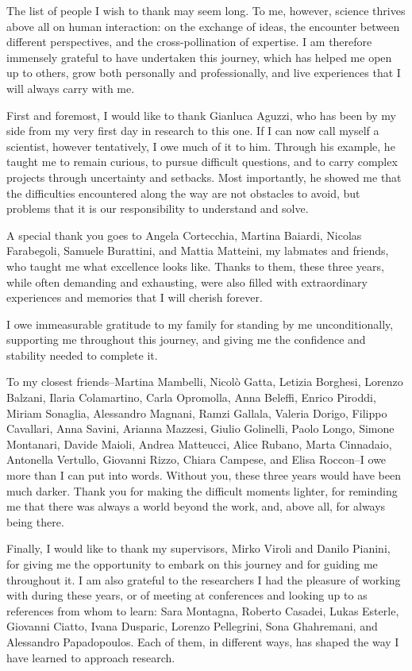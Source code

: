 \documentclass[12pt,a4paper,openright,twoside]{book}
\begin{document}
\begin{acknowledgements} 

The list of people I wish to thank may seem long. 
%
To me, however, 
 science thrives above all on human interaction: 
 on the exchange of ideas, the encounter between different perspectives, 
 and the cross-pollination of expertise. 
% 
I am therefore immensely grateful to have undertaken this journey, 
 which has helped me open up to others, grow both personally and professionally, 
 and live experiences that I will always carry with me.

First and foremost, 
 I would like to thank Gianluca Aguzzi, 
 who has been by my side from my very first day in research to this one. 
% 
If I can now call myself a scientist, 
 however tentatively,
 I owe much of it to him. 
% 
Through his example, 
 he taught me to remain curious, to pursue difficult questions, 
 and to carry complex projects through uncertainty and setbacks. 
% 
Most importantly, 
 he showed me that the difficulties encountered along the way are not obstacles to avoid,
 but problems that it is our responsibility to understand and solve.

A special thank you goes to Angela Cortecchia, Martina Baiardi, 
 Nicolas Farabegoli, Samuele Burattini, and Mattia Matteini, 
 my labmates and friends, 
 who taught me what excellence looks like.
% 
Thanks to them, these three years, 
 while often demanding and exhausting, 
 were also filled with extraordinary experiences and memories that I will cherish forever.

I owe immeasurable gratitude to my family for standing by me unconditionally, 
 supporting me throughout this journey, and giving me the confidence and stability needed to complete it.


To my closest friends--Martina Mambelli, Nicolò Gatta, Letizia Borghesi, Lorenzo Balzani,
 Ilaria Colamartino, Carla Opromolla, Anna Beleffi, Enrico Piroddi, Miriam Sonaglia, 
 Alessandro Magnani, Ramzi Gallala, Valeria Dorigo, Filippo Cavallari, Anna Savini, 
 Arianna Mazzesi, Giulio Golinelli, Paolo Longo, Simone Montanari, Davide Maioli, 
 Andrea Matteucci, Alice Rubano, Marta Cinnadaio, Antonella Vertullo, Giovanni Rizzo,
 Chiara Campese, and Elisa Roccon--I owe more than I can put into words. 
% 
Without you, 
 these three years would have been much darker. 
% 
Thank you for making the difficult moments lighter, 
for reminding me that there was always a world beyond the work, 
and, above all, for always being there.

Finally, 
 I would like to thank my supervisors, 
 Mirko Viroli and Danilo Pianini, 
 for giving me the opportunity to embark on this journey and for guiding me throughout it. 
% 
I am also grateful to the researchers I had the pleasure of working with during these years, 
 or of meeting at conferences and looking up to as references from whom to learn: 
 Sara Montagna, Roberto Casadei, Lukas Esterle, Giovanni Ciatto, 
 Ivana Dusparic, Lorenzo Pellegrini, Sona Ghahremani, 
 and Alessandro Papadopoulos.
% 
Each of them, in different ways, 
 has shaped the way I have learned to approach research.

\end{acknowledgements}
\end{document}
